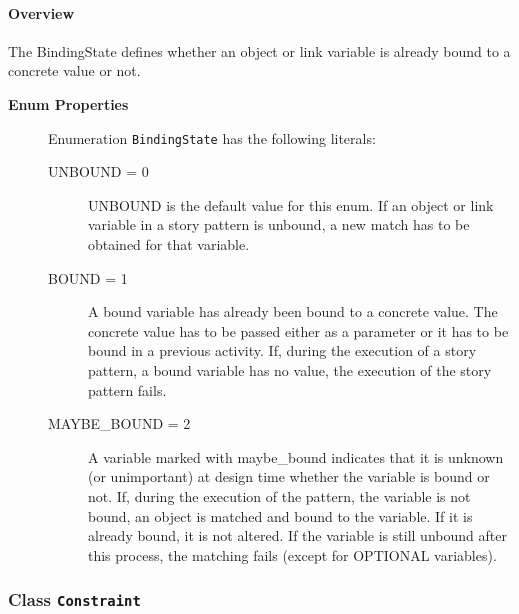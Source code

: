 \paragraph{Overview}
	
			
The BindingState defines whether an object or link variable is already bound to a concrete value or not.	
		
	


\begin{description}

	\item[\textbf{Enum Properties}] Enumeration \texttt{BindingState} has the following literals:

	\begin{description}
		
		\item[UNBOUND = 0]
		\hspace{\fill}
		\nopagebreak
		
UNBOUND is the default value for this enum. If an object or link variable in a story pattern is unbound, a new match has to be obtained for that variable.	

		\item[BOUND = 1]
		\hspace{\fill}
		\nopagebreak
		
A bound variable has already been bound to a concrete value. The concrete value has to be passed either as a parameter or it has to be bound in a previous activity. If, during the execution of a story pattern, a bound variable has no value, the execution of the story pattern fails.	

		\item[MAYBE\_BOUND = 2]
		\hspace{\fill}
		\nopagebreak
		
A variable marked with maybe\_bound indicates that it is unknown (or unimportant) at design time whether the variable is bound or not. If, during the execution of the pattern, the variable is not bound, an object is matched and bound to the variable. If it is already bound, it is not altered. If the variable is still unbound after this process, the matching fails (except for OPTIONAL variables).	
 
	\end{description}

\end{description}



\subsubsection{\Large{Class \bfseries \texttt{Constraint}\normalfont}}
\label{cls:modeling::patterns::Constraint} 
